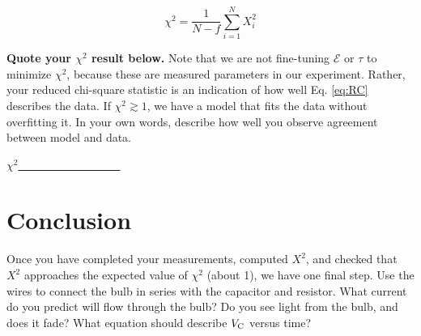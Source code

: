 \documentclass[12pt]{article}
\begin{document}
\begin{equation}
\chi^2 = \frac{1}{N-f}\sum_{i = 1}^N X_i^2 \label{eq:chi_sq_red}
\end{equation}

\textbf{Quote your $\chi^2$ result below.}  Note that we are not fine-tuning $\mathcal{E}$ or $\tau$ to minimize $\chi^2$, because these are measured parameters in our experiment.  Rather, your reduced chi-square statistic is an indication of how well Eq. \ref{eq:RC} describes the data.  If $\chi^2 \gtrsim 1$, we have a model that fits the data without overfitting it.  In your own words, describe how well you observe agreement between model and data.  \\ \vspace{1cm}

$\chi^2$\underline{~~~~~~~~~~~~~~~~~~}

\section{Conclusion}

Once you have completed your measurements, computed $X^2$, and checked that $X^2$ approaches the expected value of $\chi^2$ (about 1), we have one final step.  Use the wires to connect the bulb in series with the capacitor and resistor.  What current do you predict will flow through the bulb?  Do you see light from the bulb, and does it fade?  What equation should describe $V_{\rm C}$ versus time?
\end{document}
